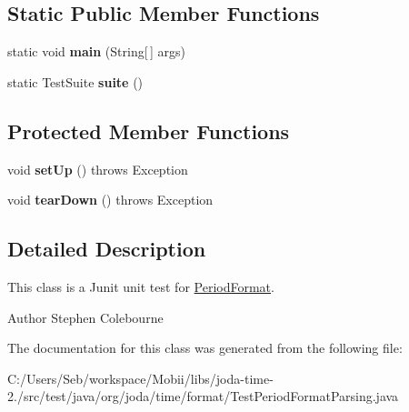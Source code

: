 \subsection*{Static Public Member Functions}
\begin{DoxyCompactItemize}
\item 
\hypertarget{classorg_1_1joda_1_1time_1_1format_1_1_test_period_format_parsing_ac05239268c5917857de81e5825223d5c}{static void {\bfseries main} (String\mbox{[}$\,$\mbox{]} args)}\label{classorg_1_1joda_1_1time_1_1format_1_1_test_period_format_parsing_ac05239268c5917857de81e5825223d5c}

\item 
\hypertarget{classorg_1_1joda_1_1time_1_1format_1_1_test_period_format_parsing_a1974d762c5de0e9f1c3b6d46ddf40ceb}{static Test\-Suite {\bfseries suite} ()}\label{classorg_1_1joda_1_1time_1_1format_1_1_test_period_format_parsing_a1974d762c5de0e9f1c3b6d46ddf40ceb}

\end{DoxyCompactItemize}
\subsection*{Protected Member Functions}
\begin{DoxyCompactItemize}
\item 
\hypertarget{classorg_1_1joda_1_1time_1_1format_1_1_test_period_format_parsing_a24856c574c37b1e49226db48e8d217ee}{void {\bfseries set\-Up} ()  throws Exception }\label{classorg_1_1joda_1_1time_1_1format_1_1_test_period_format_parsing_a24856c574c37b1e49226db48e8d217ee}

\item 
\hypertarget{classorg_1_1joda_1_1time_1_1format_1_1_test_period_format_parsing_a711ba096f13201ab80a4d1635e267aa6}{void {\bfseries tear\-Down} ()  throws Exception }\label{classorg_1_1joda_1_1time_1_1format_1_1_test_period_format_parsing_a711ba096f13201ab80a4d1635e267aa6}

\end{DoxyCompactItemize}


\subsection{Detailed Description}
This class is a Junit unit test for \hyperlink{classorg_1_1joda_1_1time_1_1format_1_1_period_format}{Period\-Format}.

\begin{DoxyAuthor}{Author}
Stephen Colebourne 
\end{DoxyAuthor}


The documentation for this class was generated from the following file\-:\begin{DoxyCompactItemize}
\item 
C\-:/\-Users/\-Seb/workspace/\-Mobii/libs/joda-\/time-\/2./src/test/java/org/joda/time/format/Test\-Period\-Format\-Parsing.\-java\end{DoxyCompactItemize}
